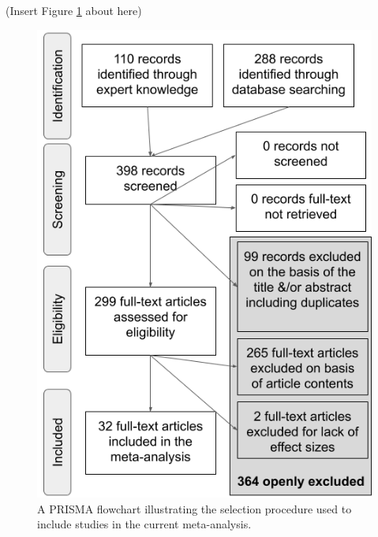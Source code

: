 \documentclass[
  english,
  man, noextraspace]{apa6}
\begin{document}
(Insert Figure \ref{fig:PRISMA-image} about here)

\begin{figure}
\includegraphics[width=1\linewidth]{figures/Figure_1_PRISMA_MA_Mispronunciation} \caption{A PRISMA flowchart illustrating the selection procedure used to include studies in the current meta-analysis.}\label{fig:PRISMA-image}
\end{figure}
\end{document}
